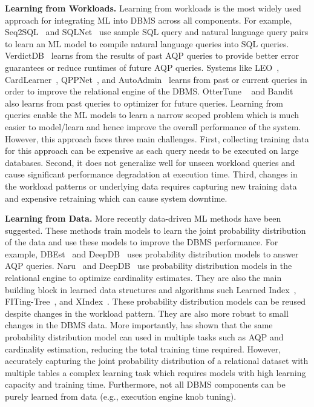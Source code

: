 \vspace{2mm}
\noindent \textbf{Learning from Workloads.} Learning from workloads is the most widely used approach for integrating ML into DBMS across all components.
For example, Seq2SQL~\cite{seq2sql} and SQLNet~\cite{sqlnet} use sample SQL query and natural language query pairs to learn an ML model to compile natural language queries into SQL queries.
VerdictDB~\cite{verdict} learns from the results of past AQP queries to provide better error guarantees or reduce runtimes of future AQP queries.
Systems like LEO~\cite{leo}, CardLearner~\cite{cardlearner}, QPPNet~\cite{qppnet}, and AutoAdmin~\cite{autoadmin} learns from past or current queries in order to improve the relational engine of the DBMS.
OtterTune ~\cite{ottertune} and Bandit~\cite{bandit} also learns from past queries to optimizer for future queries.
Learning from queries enable the ML models to learn a narrow scoped problem which is much easier to model/learn and hence improve the overall performance of the system.
However, this approach faces three main challenges.
First, collecting training data for this approach can be expensive as each query needs to be executed on large databases.
Second, it does not generalize well for unseen workload queries and cause significant performance degradation at execution time.
Third, changes in the workload patterns or underlying data requires capturing new training data and expensive retraining which can cause system downtime.

\vspace{2mm}
\noindent \textbf{Learning from Data.} More recently data-driven ML methods have been suggested.
These methods train models to learn the joint probability distribution of the data and use these models to improve the DBMS performance.
For example, DBEst~\cite{dbest} and DeepDB~\cite{deepdb} uses probability distribution models to answer AQP queries.
Naru~\cite{naru} and DeepDB~\cite{deepdb} use probability distribution models in the relational engine to optimize cardinality estimates.
They are also the main building block in learned data structures and algorithms such Learned Index~\cite{learnedindex}, FITing-Tree~\cite{fitingtree}, and XIndex~\cite{xindex}.
These probability distribution models can be reused despite changes in the workload pattern.
They are also more robust to small changes in the DBMS data.
More importantly, \cite{deepdb} has shown that the same probability distribution model can used in multiple tasks such as AQP and cardinality estimation, reducing the total training time required.
However, accurately capturing the joint probability distribution of a relational dataset with multiple tables a complex learning task which requires models with high learning capacity and training time.
Furthermore, not all DBMS components can be purely learned from data (e.g., execution engine knob tuning).

